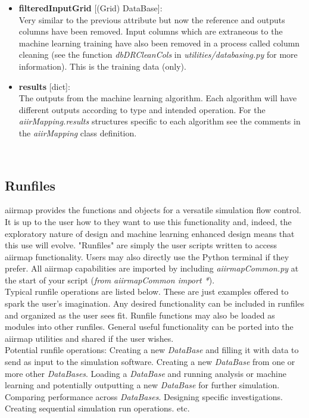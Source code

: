 \documentclass[a4paper,12pt,english]{article}
\begin{document}
\begin{itemize}
    \item \textbf{filteredInputGrid} [(Grid) DataBase]:\\
    Very similar to the previous attribute but now the reference and outputs columns have been removed. Input columns which are extraneous to the machine learning training have also been removed in a process called column cleaning (see the function \textit{dbDRCleanCols} in \textit{utilities/databasing.py} for more information). This is the training data (only).  
    \item \textbf{results} [dict]:\\
    The outputs from the machine learning algorithm. Each algorithm will have different outputs according to type and intended operation. For the \textit{aiirMapping.results} structures specific to each algorithm see the comments in the \textit{aiirMapping} class definition.
    
    \end{itemize}\\
    
    \subsection{Runfiles} \label{runfiles}
    aiirmap provides the functions and objects for a versatile simulation flow control. It is up to the user how to they want to use this functionality and, indeed, the exploratory nature of design and machine learning enhanced design means that this use will evolve. "Runfiles" are simply the user scripts written to access aiirmap functionality. Users may also directly use the Python terminal if they prefer. All aiirmap capabilities are imported by including \textit{aiirmapCommon.py} at the start of your script (\textit{from aiirmapCommon import *}). \\

    Typical runfile operations are listed below. These are just examples offered to spark the user's imagination. Any desired functionality can be included in runfiles and organized as the user sees fit. Runfile functions may also be loaded as modules into other runfiles. General useful functionality can be ported into the aiirmap utilities and shared if the user wishes.   \\
    
    Potential runfile operations: Creating a new \textit{DataBase} and filling it with data to send as input to the simulation software. Creating a new \textit{DataBase} from one or more other \textit{DataBases}. Loading a \textit{DataBase} and running analysis or machine learning and potentially outputting a new \textit{DataBase} for further simulation. Comparing performance across \textit{DataBases}. Designing specific investigations. Creating sequential simulation run operations. etc. \\  
\end{document}
